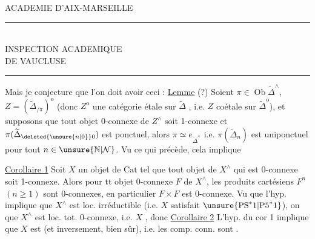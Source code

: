 \begin{center}
ACADEMIE D'AIX-MARSEILLE\\
\rule{4em}{0.4pt}\\
INSPECTION ACADEMIQUE\\
DE VAUCLUSE\\
\rule{1.6em}{0.4pt}
\end{center}
Mais je conjecture que l'on doit avoir ceci :
\uline{Lemme} (?) Soient $\pi\in\operatorname{Ob}\widetilde\Delta^\wedge$, $Z=(\widetilde\Delta_{/\pi})^{\mathrm o}$ (donc $Z^{\mathrm o}$ une catégorie étale sur $\widetilde\Delta$ , i.e. $Z$ coétale sur $\widetilde\Delta^{\mathrm o}$), et supposons que  tout objet 0-connexe de $Z^\wedge$ soit 1-connexe et  $\pi(\widetilde\Delta_{\deleted{\unsure{n|0}}0})$ est ponctuel, alors $\pi\simeq e_{\widetilde\Delta^\wedge}$ i.e. $\pi(\widetilde\Delta_n)$ est uniponctuel pour tout $n\in\unsure{\mathbb N|\mathcal N}$.
Vu ce qui précède, cela implique

\uline{Corollaire 1} Soit $X$ un objet de $\mathrm{Cat}$ tel que tout objet de $X^\wedge$ qui est 0-connexe soit 1-connexe. Alors  pour tt objet 0-connexe $F$ de $X^\wedge$, les produits cartésiens $F^n$ $(n\geq1)$ sont 0-connexes, en particulier $F\times F$ est 0-connexe.
Vu  que  l'hyp. implique que $X^\wedge$ est loc. irréductible (i.e. $X$ satisfait $\unsure{\mathrm{PS}^*1|\mathrm{P5}^*1}$), on  que $X^\wedge$ est loc. tot. 0-connexe, i.e. $X$  , donc
\uline{Corollaire 2} L'hyp. du cor 1 implique que $X$ est   (et inversement, bien sûr), i.e. les comp. conn. sont .
